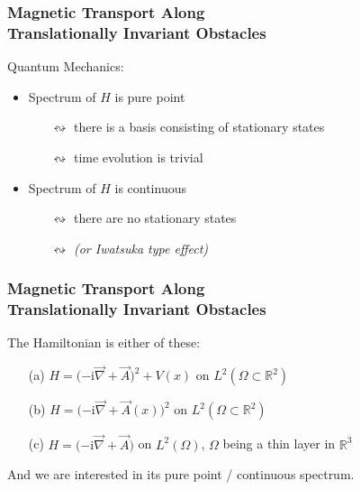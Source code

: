 \documentclass{beamer}
\renewcommand{\i}{\ensuremath{\mathrm i}}
\newcommand{\R}{\ensuremath{\mathbb R}}
\begin{document}
\begin{frame}
    \frametitle{Magnetic Transport \color{gray} Along \\ Translationally Invariant Obstacles}
    Quantum Mechanics: \\[15pt]
    \begin{itemize}
        \pause
        \item Spectrum of $H$ is pure point
        \begin{itemize}
            \pause
            \item[$\leftrightsquigarrow$] there is a basis consisting of stationary states
            \pause
            \item[$\leftrightsquigarrow$] time evolution is trivial \\[15pt]
        \end{itemize}
        \pause
        \item Spectrum of $H$ is continuous
        \begin{itemize}
            \pause
            \item[$\leftrightsquigarrow$] there are no stationary states
            \pause
            \item[$\leftrightsquigarrow$]  \textit{(or Iwatsuka type effect)}
        \end{itemize}
    \end{itemize}
    \vspace*{2cm}
\end{frame}

\begin{frame}
    \frametitle{Magnetic Transport Along \\ Translationally Invariant Obstacles}
    The Hamiltonian is either of these:
    \\[15pt]
    \begin{enumerate}
        \item[(a)] $H = \big({ -\i\vec\nabla + \vec A }\big)^2 + V(x)$ on $L^2(\Omega \subset \R^2)$
        \item[(b)] $H = \big({ -\i\vec\nabla + \vec A(x)}\big)^2$ on $L^2(\Omega \subset \R^2)$
        \item[(c)] $H = \big({ -\i\vec\nabla + \vec A})$ on $L^2(\Omega)$, $\Omega$ being a thin layer in $\R^3$
        \\[15pt]
    \end{enumerate}
    And we are interested in its pure point / continuous spectrum.
\end{frame}
\end{document}
